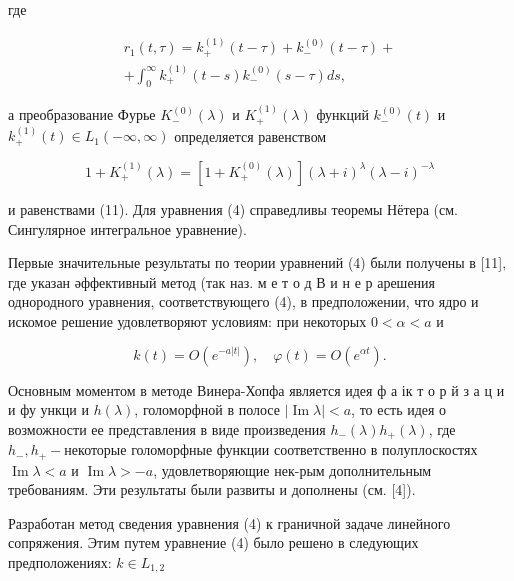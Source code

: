 \documentclass[10pt]{article}
\begin{document}
где



\[

\begin{gathered}

r_{1}(t, \tau)=k_{+}^{(1)}(t-\tau)+k_{-}^{(0)}(t-\tau)+ \\

+\int_{0}^{\infty} k_{+}^{(1)}(t-s) k_{-}^{(0)}(s-\tau) d s,

\end{gathered}

\]



а преобразование Фурье $K_{-}^{(0)}(\lambda)$ и $K_{+}^{(1)}(\lambda)$ функций $k_{-}^{(0)}(t)$ и $k_{+}^{(1)}(t) \in L_{1}(-\infty, \infty)$ определяется равенством



\[

1+K_{+}^{(1)}(\lambda)=\left[1+K_{+}^{(0)}(\lambda)\right](\lambda+i)^{\lambda}(\lambda-i)^{-\lambda}

\]



и равенствами (11). Для уравнения (4) справедливы теоремы Нётера (см. Сингулярное интегральное уравнение).



Первые значительные результаты по теории уравнений (4) были получены в [11], где указан әффективный метод (так наз. м е т о д В и н е р арешения однородного уравнения, соответствующего (4), в предположении, что ядро и искомое решение удовлетворяют условиям: при некоторых $0<\alpha<a$ и



\[

k(t)=O\left(e^{-a|t|}\right), \quad \varphi(t)=O\left(e^{\alpha t}\right) .

\]



Основным моментом в методе Винера-Хопфа является идея ф а ік т о р й з а ц и и фу ункци и $h(\lambda)$, голоморфной в полосе $|\operatorname{Im} \lambda|<a$, то есть идея о возможности ее представления в виде произведения $h_{-}(\lambda) h_{+}(\lambda)$, где $h_{-}, h_{+}-$некоторые голоморфные функции соответственно в полуплоскостях $\operatorname{Im} \lambda<a$ и $\operatorname{Im} \lambda>-a$, удовлетворяющие нек-рым дополнительным требованиям. Эти результаты были развиты и дополнены (см. [4]).



Разработан метод сведения уравнения (4) к граничной задаче линейного сопряжения. Этим путем уравнение (4) было решено в следующих предположениях: $k \in L_{1,2}$
\end{document}
